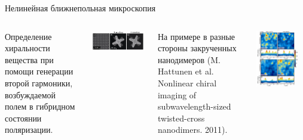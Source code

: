 \documentclass[9pt, compress, xcolor=table]{beamer}
\begin{document}
\begin{frame}{Нелинейная ближнепольная микроскопия}

    
\begin{columns}[c]
\column{6.5cm}

Определение хиральности вещества при помощи генерации второй гармоники, возбуждаемой полем в гибридном состоянии поляризации.

\begin{center}
\includegraphics[width=\textwidth]{nanodimer1}
\end{center}

На примере в разные стороны закрученных нанодимеров (M. Hattunen et al. Nonlinear chiral imaging of subwavelength-sized twisted-cross nanodimers. 2011).
 
\column{6cm}
\begin{center}
\includegraphics[width=0.85\textwidth]{nanodimer2}
\end{center}


\end{columns}
    
\end{frame}
\end{document}
